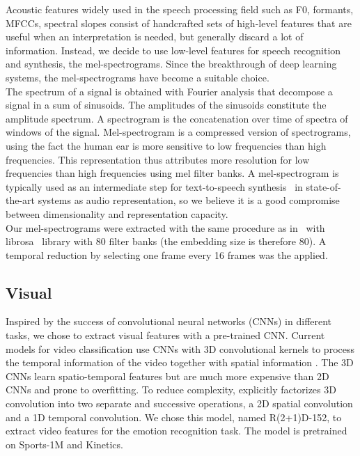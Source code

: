 \documentclass[11pt,a4paper]{article}
\begin{document}
Acoustic features widely used in the speech processing field such as F0, formants, MFCCs, spectral slopes consist of handcrafted sets of high-level features that are useful when an interpretation is needed, but generally discard a lot of information. Instead, we decide to use low-level features for speech recognition and synthesis, the mel-spectrograms. Since the breakthrough of deep learning systems, the mel-spectrograms have become a suitable choice. \\

The spectrum of a signal is obtained with Fourier analysis that decompose a signal in a sum of sinusoids. The amplitudes of the sinusoids constitute the amplitude spectrum. A spectrogram is the concatenation over time of spectra of windows of the signal. Mel-spectrogram is a compressed version of spectrograms, using the fact the human ear is more sensitive to low frequencies than high frequencies. This representation thus attributes more resolution for low frequencies than high frequencies using mel filter banks. A mel-spectrogram is typically used as an intermediate step for text-to-speech synthesis~\cite{dctts-18-tachibana} in state-of-the-art systems as audio representation, so we believe it is a good compromise between dimensionality and representation capacity. \\

Our mel-spectrograms were extracted with the same procedure as in~\cite{dctts-18-tachibana} with librosa~\cite{librosa-15-mcfee} library with 80 filter banks (the embedding size is therefore 80). A temporal reduction by selecting one frame every 16 frames was the applied.



\subsection{Visual}
Inspired by the success of convolutional neural networks (CNNs) in different tasks, we chose to extract visual features with a pre-trained CNN. Current models for video classification use CNNs with 3D convolutional kernels to process the temporal information of the video together with spatial information \cite{tran2015learning}. The 3D CNNs learn spatio-temporal features but are much more expensive than 2D CNNs and prone to overfitting. To reduce complexity, \citet{tran2018closer} explicitly factorizes 3D convolution into two separate and successive operations, a 2D spatial convolution and a 1D temporal convolution. We chose this model, named R(2+1)D-152, to extract video features for the emotion recognition task. The model is pretrained on Sports-1M and Kinetics. \\
\end{document}
